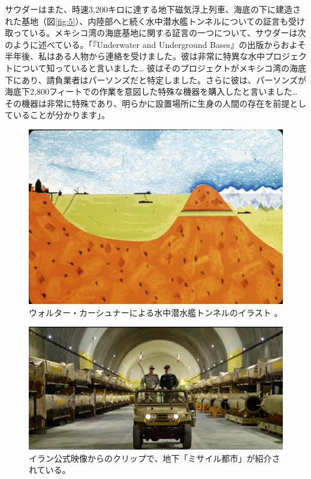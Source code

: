 \documentclass[10pt,twocolumn,letterpaper]{article}
\begin{document}
サウダーはまた、時速3,200キロに達する地下磁気浮上列車、海底の下に建造された基地（図\ref{fig:5}）、内陸部へと続く水中潜水艦トンネルについての証言も受け取っている。メキシコ湾の海底基地に関する証言の一つについて、サウダーは次のように述べている。「『Underwater and Underground Bases』の出版からおよそ半年後、私はある人物から連絡を受けました。彼は非常に特異な水中プロジェクトについて知っていると言いました… 彼はそのプロジェクトがメキシコ湾の海底下にあり、請負業者はパーソンズだと特定しました。さらに彼は、パーソンズが海底下2,800フィートでの作業を意図した特殊な機器を購入したと言いました… その機器は非常に特殊であり、明らかに設置場所に生身の人間の存在を前提としていることが分かります」\cite{22}。

\begin{figure}[t]
\begin{center}
   \includegraphics[width=1\linewidth]{sub.jpg}
\end{center}
   \caption{ウォルター・カーシュナーによる水中潜水艦トンネルのイラスト \cite{22,23}。}
\label{fig:6}
\label{fig:onecol}

\end{figure}

\begin{figure}[t]
\begin{center}
   \includegraphics[width=1\linewidth]{iran.jpeg}
\end{center}
   \caption{イラン公式映像からのクリップで、地下「ミサイル都市」が紹介されている\cite{39,40}。}
\label{fig:12}
\label{fig:onecol}
\end{figure}
\end{document}
